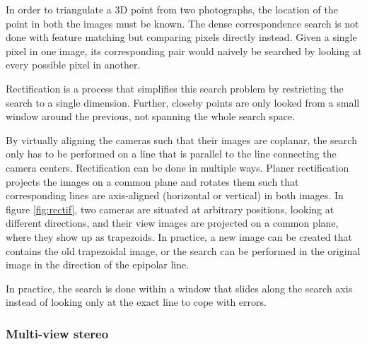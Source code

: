 
In order to triangulate a 3D point from two photographs, the location of the point in both the images must be known.
The dense correspondence search is not done with feature matching but comparing pixels directly instead.
Given a single pixel in one image, its corresponding pair would naively be searched by looking at every possible pixel in another.

Rectification is a process that simplifies this search problem by restricting the search to a single dimension.
Further, closeby points are only looked from a small window around the previous, not spanning the whole search space.

By virtually aligning the cameras such that their images are coplanar, the search only has to be performed on a line that is parallel to the line connecting the camera centers.
Rectification can be done in multiple ways.
Planer rectification projects the images on a common plane and rotates them such that corresponding lines are axis-aligned (horizontal or vertical) in both images. \cite{hartley03multiview}
In figure \ref{fig:rectif}, two cameras are situated at arbitrary positions, looking at different directions, and their view images are projected on a common plane, where they show up as trapezoids.
In practice, a new image can be created that contains the old trapezoidal image, or the search can be performed in the original image in the direction of the epipolar line.

In practice, the search is done within a window that slides along the search axis instead of looking only at the exact line to cope with errors.





\subsubsection{Multi-view stereo} %

